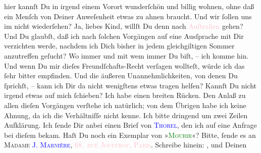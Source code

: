                hier kannſt Du in irgend einem Vorort wunderſchön und billig wohnen, ohne daß ein
               Menſch von Deiner Anweſenheit etwas zu ahnen braucht. Und wir ſollen uns im \label{K_L02802-23v}\label{K_L02802-23h} nicht wiederſehen?
               Ja, liebes Kind, willſt Du denn nach \textcolor{pink}{Auſtralien}{}\ledrightnote{\textcolor{pink}{Australien}}
               gehen? Und Du glaubſt, daß ich {\pb}nach ſolchen
               Vorgängen auf eine Ausſprache mit Dir verzichten werde, nachdem ich Dich bisher in
               jedem gleichgiltigen Sommer anzutreffen geſucht? Wo immer und mit wem immer Du biſt,
               – ich komme hin. Und wenn Du mir dieſes Freundſchafts-Recht verſagen wollteſt, würde
               ich das ſehr bitter empfinden. Und die äußeren Unannehmlichkeiten, von denen Du
               ſprichſt, – kann ich Dir da nicht wenigſtens etwas tragen helfen? Kannſt Du nicht
               irgend etwas auf mich ſchieben? Ich habe einen breiten Rücken.\pend
           \pstart
           {\pb}Den Anlaß zu allen dieſen Vorgängen verſtehe ich
               natürlich; von dem Übrigen habe ich keine Ahnung, da ich die Verhältniſſe nicht
               kenne. Ich bitte dringend um zwei Zeilen Aufklärung.\pend
           \pstart
           Ich ſende Dir anbei einen Brief von \textsc{\textcolor{blue}{Thorel}{}\ledrightnote{\textcolor{blue}{Jean Thorel}}}, den ich auf eine Anfrage bei dieſem bekam.\pend
           \pstart
           Haſt Du noch ein Exemplar von »\textsc{\textcolor{green}{Mourir}{}\ledrightnote{\textcolor{green}{Mourir. Roman}}}«? Bitte, ſende es\strikeout{,}{ } an \textsc{Madame \textcolor{blue}{J. Marnière}{}\ledrightnote{\textcolor{blue}{Jeanne Marni}}}, \textsc{\textcolor{pink}{68. rue Jouffroy, Paris}{}\ledrightnote{\textcolor{pink}{Rue Jouffroy d'Abbans}}}. Schreibe hinein: \label{K_L02802-25v}\label{K_L02802-25h}, und Deinen
